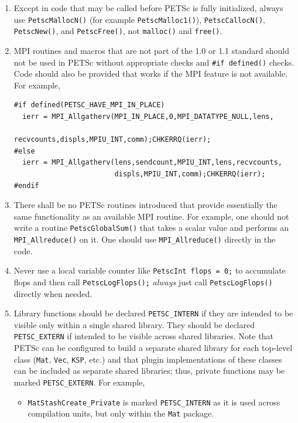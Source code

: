 \begin{enumerate}
\begin{lstlisting}
\end{lstlisting}
\item Except in code that may be called before PETSc is fully initialized, always use \lstinline{PetscMallocN()} (for example \lstinline{PetscMalloc1()}), \lstinline{PetscCallocN()}, \lstinline{PetscNew()}, and \lstinline{PetscFree()}, not \lstinline{malloc()} and \lstinline{free()}.
\item MPI routines and macros that are not part of the 1.0 or 1.1 standard should not be used in PETSc without appropriate  checks and \lstinline{#if defined()} checks.
 Code should also be provided that works if the MPI feature is not available. For example,
\begin{lstlisting}
#if defined(PETSC_HAVE_MPI_IN_PLACE)
  ierr = MPI_Allgatherv(MPI_IN_PLACE,0,MPI_DATATYPE_NULL,lens,
                        recvcounts,displs,MPIU_INT,comm);CHKERRQ(ierr);
#else
  ierr = MPI_Allgatherv(lens,sendcount,MPIU_INT,lens,recvcounts,
                        displs,MPIU_INT,comm);CHKERRQ(ierr);
#endif
\end{lstlisting}
\item There shall be no PETSc routines introduced that provide essentially the same functionality as an available MPI routine.
  For example, one should not write a routine \lstinline{PetscGlobalSum()} that takes a scalar value and performs an \lstinline{MPI_Allreduce()} on it.
  One should use \lstinline{MPI_Allreduce()} directly in the code.
\item Never use a local variable counter like \lstinline{PetscInt flops = 0;} to accumulate flops and then call \lstinline{PetscLogFlops();} {\em always} just
  call \lstinline{PetscLogFlops()} directly when needed.
\item \label{styleitem:petscextern} Library functions should be declared \lstinline{PETSC_INTERN} if they are intended to be visible only within a single shared library.
They should be declared \lstinline{PETSC_EXTERN} if intended to be visible across shared libraries.
Note that PETSc can be configured to build a separate shared library for each top-level class (\lstinline{Mat}, \lstinline{Vec}, \lstinline{KSP}, etc.) and that plugin implementations of these classes can be included as separate shared libraries; thus, private functions may be marked \lstinline{PETSC_EXTERN}.
For example,
\begin{itemize}
\item \lstinline{MatStashCreate_Private} is marked \lstinline{PETSC_INTERN} as it is used across compilation units, but only within the \lstinline{Mat} package.

\end{itemize}
\end{enumerate}
